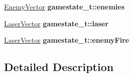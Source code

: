 \begin{DoxyCompactItemize}
\hyperlink{structenemyVector}{Enemy\+Vector} {\bfseries gamestate\+\_\+t\+::enemies}
\item 
\mbox{\label{group__GameState_ga8bc74ab7791af253098936ad75f26a9b}} 
\hyperlink{structlaserVector}{Laser\+Vector} {\bfseries gamestate\+\_\+t\+::laser}
\item 
\mbox{\label{group__GameState_gabb2e716aa5888aa0d282eea59da35247}} 
\hyperlink{structlaserVector}{Laser\+Vector} {\bfseries gamestate\+\_\+t\+::enemy\+Fire}
\end{DoxyCompactItemize}


\subsection{Detailed Description}
